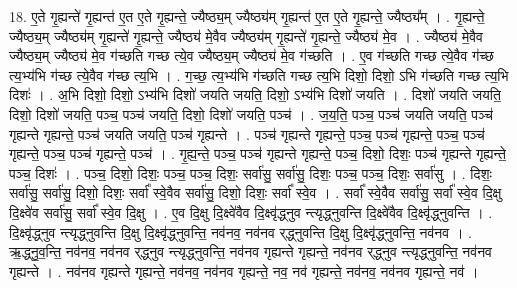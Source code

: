 \documentclass[17pt]{extarticle}
\begin{document}
18. ए॒ते गृ॒ह्यन्ते॑ गृ॒ह्यन्त॑ ए॒त ए॒ते गृ॒ह्यन्ते॒ ज्यैष्ठ्य॒म् ज्यैष्ठ्य॑म् गृ॒ह्यन्त॑ ए॒त ए॒ते गृ॒ह्यन्ते॒ ज्यैष्ठ्य᳚म् । . गृ॒ह्यन्ते॒ ज्यैष्ठ्य॒म् ज्यैष्ठ्य॑म् गृ॒ह्यन्ते॑ गृ॒ह्यन्ते॒ ज्यैष्ठ्य॑ मे॒वैव ज्यैष्ठ्य॑म् गृ॒ह्यन्ते॑ गृ॒ह्यन्ते॒ ज्यैष्ठ्य॑ मे॒व । . ज्यैष्ठ्य॑ मे॒वैव ज्यैष्ठ्य॒म् ज्यैष्ठ्य॑ मे॒व ग॑च्छति गच्छ त्ये॒व ज्यैष्ठ्य॒म् ज्यैष्ठ्य॑ मे॒व ग॑च्छति । . ए॒व ग॑च्छति गच्छ त्ये॒वैव ग॑च्छ त्य॒भ्य॑भि ग॑च्छ त्ये॒वैव ग॑च्छ त्य॒भि । . ग॒च्छ॒ त्य॒भ्य॑भि ग॑च्छति गच्छ त्य॒भि दिशो॒ दिशो॒ ऽभि ग॑च्छति गच्छ त्य॒भि दिशः॑ । . अ॒भि दिशो॒ दिशो॒ ऽभ्य॑भि दिशो॑ जयति जयति॒ दिशो॒ ऽभ्य॑भि दिशो॑ जयति । . दिशो॑ जयति जयति॒ दिशो॒ दिशो॑ जयति॒ पञ्च॒ पञ्च॑ जयति॒ दिशो॒ दिशो॑ जयति॒ पञ्च॑ । . ज॒य॒ति॒ पञ्च॒ पञ्च॑ जयति जयति॒ पञ्च॑ गृह्यन्ते गृह्यन्ते॒ पञ्च॑ जयति जयति॒ पञ्च॑ गृह्यन्ते । . पञ्च॑ गृह्यन्ते गृह्यन्ते॒ पञ्च॒ पञ्च॑ गृह्यन्ते॒ पञ्च॒ पञ्च॑ गृह्यन्ते॒ पञ्च॒ पञ्च॑ गृह्यन्ते॒ पञ्च॑ । . गृ॒ह्य॒न्ते॒ पञ्च॒ पञ्च॑ गृह्यन्ते गृह्यन्ते॒ पञ्च॒ दिशो॒ दिशः॒ पञ्च॑ गृह्यन्ते गृह्यन्ते॒ पञ्च॒ दिशः॑ । . पञ्च॒ दिशो॒ दिशः॒ पञ्च॒ पञ्च॒ दिशः॒ सर्वा॑सु॒ सर्वा॑सु॒ दिशः॒ पञ्च॒ पञ्च॒ दिशः॒ सर्वा॑सु । . दिशः॒ सर्वा॑सु॒ सर्वा॑सु॒ दिशो॒ दिशः॒ सर्वा᳚ स्वे॒वैव सर्वा॑सु॒ दिशो॒ दिशः॒ सर्वा᳚ स्वे॒व । . सर्वा᳚ स्वे॒वैव सर्वा॑सु॒ सर्वा᳚ स्वे॒व दि॒क्षु दि॒क्ष्वे॑व सर्वा॑सु॒ सर्वा᳚ स्वे॒व दि॒क्षु । . ए॒व दि॒क्षु दि॒क्ष्वे॑वैव दि॒क्ष्वृ॑द्ध्नुव न्त्यृद्ध्नुवन्ति दि॒क्ष्वे॑वैव दि॒क्ष्वृ॑द्ध्नुवन्ति । . दि॒क्ष्वृ॑द्ध्नुव न्त्यृद्ध्नुवन्ति दि॒क्षु दि॒क्ष्वृ॑द्ध्नुवन्ति॒ नव॑नव॒ नव॑नव र्‌द्ध्नुवन्ति दि॒क्षु दि॒क्ष्वृ॑द्ध्नुवन्ति॒ नव॑नव । . ऋ॒द्ध्नु॒व॒न्ति॒ नव॑नव॒ नव॑नव र्‌द्ध्नुव न्त्यृद्ध्नुवन्ति॒ नव॑नव गृह्यन्ते गृह्यन्ते॒ नव॑नव र्‌द्ध्नुव न्त्यृद्ध्नुवन्ति॒ नव॑नव गृह्यन्ते । . नव॑नव गृह्यन्ते गृह्यन्ते॒ नव॑नव॒ नव॑नव गृह्यन्ते॒ नव॒ नव॑ गृह्यन्ते॒ नव॑नव॒ नव॑नव गृह्यन्ते॒ नव॑ । \newline
\end{document}
